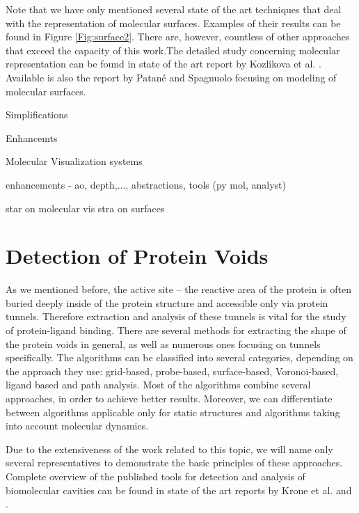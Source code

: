 Note that we have only mentioned several state of the art techniques that deal with the representation of molecular surfaces. Examples of their results can be found in Figure \ref{Fig:surface2}. There are, however, countless of other approaches that exceed the capacity of this work.The detailed study concerning molecular representation can be found in state of the art report by Kozlikova et al. \cite{kozlikova2015visualization}. Available is also the report by Patané and Spagnuolo focusing on modeling of molecular surfaces.

Simplifications

Enhancemts


Molecular Visualization systems

enhancements - ao, depth,..., abstractions, tools (py mol, analyst)





star on molecular vis \cite{kozlikova2015visualization}
stra on surfaces \cite{patane2015state}

\section{Detection of Protein Voids}
As we mentioned before, the active site -- the reactive area of the protein is often buried deeply inside of the protein structure and accessible only via protein tunnels. Therefore extraction and analysis of these tunnels is vital for the study of protein-ligand binding. There are several methods for extracting the shape of the protein voids in general, as well as numerous ones focusing on tunnels specifically. The algorithms can be classified into several categories, depending on the approach they use: grid-based, probe-based, surface-based, Voronoi-based, ligand based and path analysis. Most of the algorithms combine several approaches, in order to achieve better results. Moreover, we can differentiate  between algorithms applicable only for static structures and algorithms taking into account molecular dynamics.

Due to the extensiveness of the work related to this topic, we will name only several representatives to demonstrate the basic principles of these approaches. Complete overview of the published tools for detection and analysis of biomolecular cavities can be found in state of the art reports by Krone et al. \cite{krone2016visual} and \cite{simoesgeometric}.

